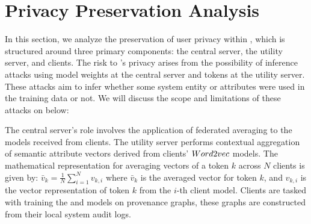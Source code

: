\section{Privacy Preservation Analysis}
\label{sec:privacy}








In this section, we analyze the preservation of user privacy within \Sys, which is structured around three primary components: the central server, the utility server, and clients. The risk to \Sys's privacy arises from the possibility of inference attacks using model weights at the central server and \wordvec tokens at the utility server. These attacks aim to infer whether some system entity or attributes were used in the training data or not. We will discuss the scope and limitations of these attacks on \Sys below:

 The central server's role involves the application of federated averaging to the \gnnshort models received from clients. The utility server performs contextual aggregation of semantic attribute vectors derived from clients' \(Word2vec\) models.  The mathematical representation for averaging vectors of a token \(k\) across \(N\) clients is given by: \( \bar{v}_k = \frac{1}{N} \sum_{i=1}^{N} v_{k,i} \) where \(\bar{v}_k\) is the averaged vector for token \(k\), and \(v_{k,i}\) is the vector representation of token \(k\) from the \(i\)-th client model. Clients are tasked with training the \wordvec and \gnnshort models on provenance graphs, these graphs are constructed from their local system audit logs.

